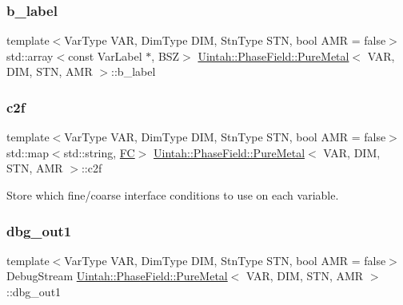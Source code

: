 \subsubsection{\texorpdfstring{b\+\_\+label}{b\_label}}
{\footnotesize\ttfamily template$<$Var\+Type V\+AR, Dim\+Type D\+IM, Stn\+Type S\+TN, bool A\+MR = false$>$ \\
std\+::array$<$const Var\+Label $\ast$, B\+SZ$>$ \hyperlink{classUintah_1_1PhaseField_1_1PureMetal}{Uintah\+::\+Phase\+Field\+::\+Pure\+Metal}$<$ V\+AR, D\+IM, S\+TN, A\+MR $>$\+::b\+\_\+label\hspace{0.3cm}{\ttfamily [protected]}}

\mbox{\label{classUintah_1_1PhaseField_1_1PureMetal_ac5f2288bfc3ee4c2d1291f9d15759aed}} 
\subsubsection{\texorpdfstring{c2f}{c2f}}
{\footnotesize\ttfamily template$<$Var\+Type V\+AR, Dim\+Type D\+IM, Stn\+Type S\+TN, bool A\+MR = false$>$ \\
std\+::map$<$std\+::string, \hyperlink{namespaceUintah_1_1PhaseField_aeb51fe956fe07f1487f5878f4039f27c}{FC}$>$ \hyperlink{classUintah_1_1PhaseField_1_1PureMetal}{Uintah\+::\+Phase\+Field\+::\+Pure\+Metal}$<$ V\+AR, D\+IM, S\+TN, A\+MR $>$\+::c2f\hspace{0.3cm}{\ttfamily [protected]}}



Store which fine/coarse interface conditions to use on each variable. 

\mbox{\label{classUintah_1_1PhaseField_1_1PureMetal_ab839d7f9525beb37d13201d4def284de}} 
\subsubsection{\texorpdfstring{dbg\+\_\+out1}{dbg\_out1}}
{\footnotesize\ttfamily template$<$Var\+Type V\+AR, Dim\+Type D\+IM, Stn\+Type S\+TN, bool A\+MR = false$>$ \\
Debug\+Stream \hyperlink{classUintah_1_1PhaseField_1_1PureMetal}{Uintah\+::\+Phase\+Field\+::\+Pure\+Metal}$<$ V\+AR, D\+IM, S\+TN, A\+MR $>$\+::dbg\+\_\+out1\hspace{0.3cm}{\ttfamily [protected]}}



